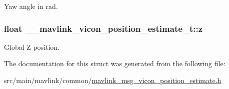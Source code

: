 Yaw angle in rad. 

\hypertarget{struct____mavlink__vicon__position__estimate__t_ae03f3f52e511da08f4df13b95fe8f7a6}{
\subsubsection[{z}]{\setlength{\rightskip}{0pt plus 5cm}float \+\_\+\+\_\+mavlink\+\_\+vicon\+\_\+position\+\_\+estimate\+\_\+t\+::z}}\label{struct____mavlink__vicon__position__estimate__t_ae03f3f52e511da08f4df13b95fe8f7a6}


Global Z position. 



The documentation for this struct was generated from the following file\+:\begin{DoxyCompactItemize}
\item 
src/main/mavlink/common/\hyperlink{mavlink__msg__vicon__position__estimate_8h}{mavlink\+\_\+msg\+\_\+vicon\+\_\+position\+\_\+estimate.\+h}\end{DoxyCompactItemize}
